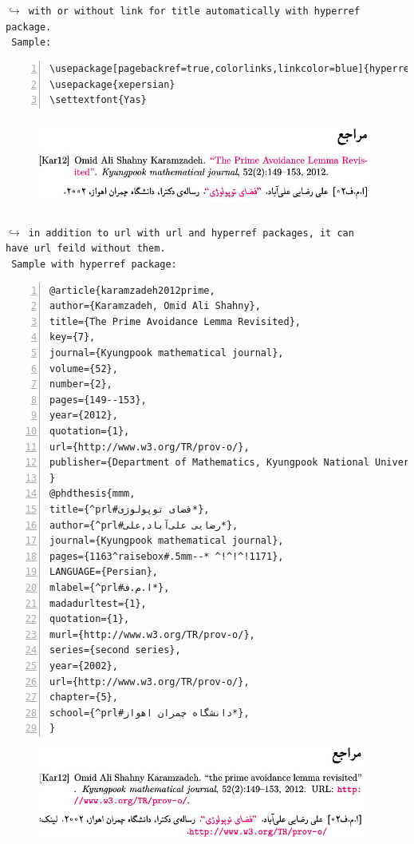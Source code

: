 \documentclass{article}
\begin{document}
\begin{latin}\noindent
{\tt {\color{red}$\hookrightarrow$ with or without link for title  automatically with hyperref\\ package.}}\\
{\tt\color{blue} Sample:}
\begin{Verbatim}[numbers=left,fontsize=\bf,commandchars=\^\#\*,baselinestretch=1,firstnumber=1,formatcom=\color{green!50!black}]
\usepackage[pagebackref=true,colorlinks,linkcolor=blue]{hyperref}
\usepackage{xepersian}
\settextfont{Yas}
\end{Verbatim}
\end{latin}
\begin{figure}[H]
\centering
\includegraphics[width=\textwidth,height=3cm]{image/sh3}
\end{figure}
\begin{latin}\noindent
{\tt {\color{red}$\hookrightarrow$ in addition to url with url and  hyperref packages,  it can\\ have url feild without them.}}\\
{\tt\color{blue} Sample with hyperref package:}
\end{latin}
\begin{Verbatim}[numbers=left,fontsize=\bf,commandchars=\^\#\*,baselinestretch=1,firstnumber=1,formatcom=\color{green!50!black}]
@article{karamzadeh2012prime,
author={Karamzadeh, Omid Ali Shahny},
title={The Prime Avoidance Lemma Revisited},
key={7},
journal={Kyungpook mathematical journal},
volume={52},
number={2},
pages={149--153},
year={2012},
quotation={1},
url={http://www.w3.org/TR/prov-o/},
publisher={Department of Mathematics, Kyungpook National University}
}
@phdthesis{mmm,
title={^prl#فضای توپولوژی*},
author={^prl#رضایی علی‌آباد,علی*},
journal={Kyungpook mathematical journal},
pages={1163^raisebox#.5mm--* ^!^!^!1171},
LANGUAGE={Persian},
mlabel={^prl#ا.م.ف*},
madadurltest={1},
quotation={1},
murl={http://www.w3.org/TR/prov-o/},
series={second series},
year={2002},
url={http://www.w3.org/TR/prov-o/},
chapter={5},
school={^prl#دانشگاه چمران اهواز*},
}
\end{Verbatim}
\begin{figure}[H]
\centering
\includegraphics[width=\textwidth,height=3cm]{image/sh4}
\end{figure}
\end{document}
